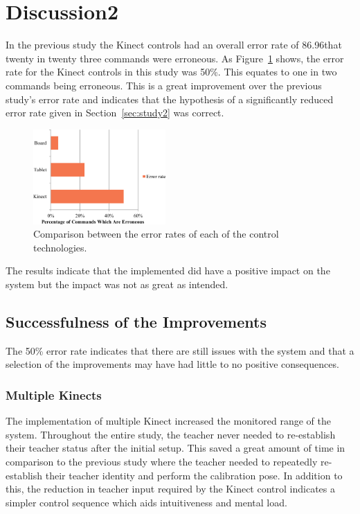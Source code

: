 \documentclass[manuscript, review, screen]{acmart}
\begin{document}
\section{Discussion2}
\label{sec:discussion2}


In the previous study the Kinect controls had an overall error rate of 86.96\meaning that twenty in twenty three commands were erroneous.
As Figure~\ref{fig:controlDevicesErrors} shows, the error rate for the Kinect controls in this study was 50\%.
This equates to one in two commands being erroneous.
This is a great improvement over the previous study's error rate and indicates that the hypothesis of a significantly reduced error rate given in Section~\ref{sec:study2} was correct.

\begin{figure}[h]
  \centering
  \includegraphics[width=0.45\textwidth]{figures/bar_chart_errors.png}
  \caption{Comparison between the error rates of each of the control technologies.}
  \label{fig:controlDevicesErrors}
\end{figure}

The results indicate that the implemented did have a positive impact on the system but the impact was not as great as intended.

\subsection{Successfulness of the Improvements}

The 50\% error rate indicates that there are still issues with the system and that a selection of the improvements may have had little to no positive consequences.

\subsubsection{Multiple Kinects}

The implementation of multiple Kinect increased the monitored range of the system.
Throughout the entire study, the teacher never needed to re-establish their teacher status after the initial setup.
This saved a great amount of time in comparison to the previous study where the teacher needed to repeatedly re-establish their teacher identity and perform the calibration pose.
In addition to this, the reduction in teacher input required by the Kinect control indicates a simpler control sequence which aids intuitiveness and mental load.
\end{document}
